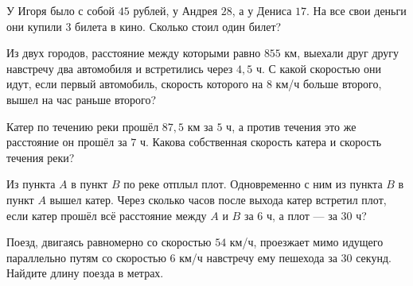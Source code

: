 \begin{class}[number=1]
\begin{listofex}
		\item У Игоря было с собой \( 45 \) рублей, у Андрея \( 28 \), а у Дениса \( 17 \). На все свои деньги они купили \( 3 \) билета в кино. Сколько стоил один билет?  
		\item Из двух городов, расстояние между которыми равно \( 855 \) км, выехали друг другу навстречу два автомобиля и встретились через \( 4,5 \) ч. С какой скоростью они идут, если первый автомобиль, скорость которого на 8 км/ч больше второго, вышел на час раньше второго?
		\item Катер по течению реки прошёл \( 87,5 \) км за \( 5 \) ч, а против течения это же расстояние он прошёл за \( 7 \) ч. Какова собственная скорость катера и скорость течения реки?
		\item Из пункта \( A \) в пункт \( B \) по реке отплыл плот. Одновременно с ним из пункта \( B \) в пункт \( A \) вышел катер. Через сколько часов после выхода катер встретил плот, если катер прошёл всё расстояние между \( A \) и \( B \) за \( 6 \) ч, а плот --- за \( 30 \) ч?
		\item Поезд, двигаясь равномерно со скоростью \( 54 \) км/ч, проезжает мимо идущего параллельно путям со скоростью \( 6 \) км/ч навстречу ему пешехода за \( 30 \) секунд. Найдите длину поезда в метрах.
	\end{listofex}
\end{class}


